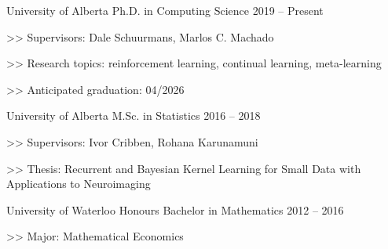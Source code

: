 
\begin{cventries}
  \cventry
    {University of Alberta}
    {Ph.D. in Computing Science}
    {2019 -- Present}
    {
      \begin{cvitems}
        \item[>>] {Supervisors: Dale Schuurmans, Marlos C. Machado}
        \item[>>] {Research topics: reinforcement learning, continual learning, meta-learning}
        \item[>>] {Anticipated graduation: 04/2026}
      \end{cvitems}
    }

  \cventry
    {University of Alberta}
    {M.Sc. in Statistics}
    {2016 -- 2018}
    {
      \begin{cvitems}
        \item[>>] {Supervisors: Ivor Cribben, Rohana Karunamuni}
        \item[>>] {Thesis: Recurrent and Bayesian Kernel Learning for Small Data with Applications to Neuroimaging}
      \end{cvitems}
    }
  \cventry
    {University of Waterloo}
    {Honours Bachelor in Mathematics}
    {2012 -- 2016}
    {
      \begin{cvitems}
        \item[>>] Major: Mathematical Economics
      \end{cvitems}
    }
\end{cventries}

